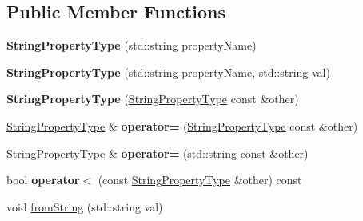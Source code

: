 \subsection*{Public Member Functions}
\begin{DoxyCompactItemize}
\item 
\hypertarget{classStringPropertyType_ac9474db13442001b615cb29b889844eb}{{\bfseries String\+Property\+Type} (std\+::string property\+Name)}\label{classStringPropertyType_ac9474db13442001b615cb29b889844eb}

\item 
\hypertarget{classStringPropertyType_a071f749092ee76790fb508f0ea8c974a}{{\bfseries String\+Property\+Type} (std\+::string property\+Name, std\+::string val)}\label{classStringPropertyType_a071f749092ee76790fb508f0ea8c974a}

\item 
\hypertarget{classStringPropertyType_a221e152eec4bfa2bab6e063dd7eb2108}{{\bfseries String\+Property\+Type} (\hyperlink{classStringPropertyType}{String\+Property\+Type} const \&other)}\label{classStringPropertyType_a221e152eec4bfa2bab6e063dd7eb2108}

\item 
\hypertarget{classStringPropertyType_a2eb25280c4494ff5f9aca137bf5040c7}{\hyperlink{classStringPropertyType}{String\+Property\+Type} \& {\bfseries operator=} (\hyperlink{classStringPropertyType}{String\+Property\+Type} const \&other)}\label{classStringPropertyType_a2eb25280c4494ff5f9aca137bf5040c7}

\item 
\hypertarget{classStringPropertyType_ad0ab1bb07b1374b04c819d9bfc3eea60}{\hyperlink{classStringPropertyType}{String\+Property\+Type} \& {\bfseries operator=} (std\+::string const \&other)}\label{classStringPropertyType_ad0ab1bb07b1374b04c819d9bfc3eea60}

\item 
\hypertarget{classStringPropertyType_a288c55819cf24e1c56614ebcc0e0a894}{bool {\bfseries operator$<$} (const \hyperlink{classStringPropertyType}{String\+Property\+Type} \&other) const }\label{classStringPropertyType_a288c55819cf24e1c56614ebcc0e0a894}

\item 
\hypertarget{classStringPropertyType_ad9dd60fcfd9fd3ebaa578815c8d552fe}{void \hyperlink{classStringPropertyType_ad9dd60fcfd9fd3ebaa578815c8d552fe}{from\+String} (std\+::string val)}\label{classStringPropertyType_ad9dd60fcfd9fd3ebaa578815c8d552fe}


\end{DoxyCompactItemize}
